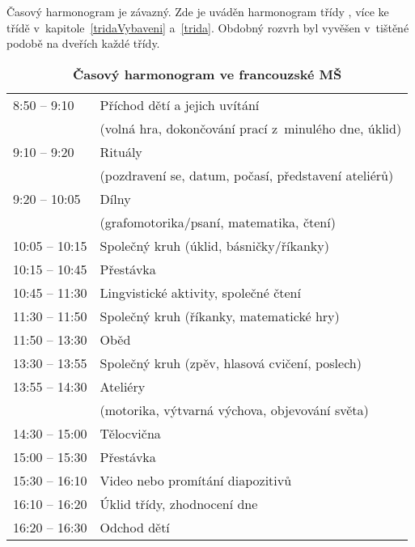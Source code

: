 			Časový harmonogram je závazný. Zde je uváděn harmonogram třídy , více ke třídě v~kapitole~\ref{tridaVybaveni} a~\ref{trida}. Obdobný rozvrh byl vyvěšen v tištěné podobě na dveřích každé třídy. 

\begin{spacing}{1.0}
	\begin{table}[h!]
		\center
		\begin{tabular}{|l l|}
			\hline
			\rowcolor{grey!0}
			8:50 – 9:10 		& Příchod dětí a jejich uvítání 						\\
								& (volná hra, dokončování prací z minulého dne, úklid) 	\\
			9:10 – 9:20			& Rituály 												\\
								& (pozdravení se, datum, počasí, představení ateliérů) 	\\
			9:20 – 10:05		& Dílny 												\\
								& (grafomotorika/psaní, matematika, čtení) 				\\
			10:05 – 10:15		& Společný kruh (úklid, básničky/říkanky) 				\\
			10:15 – 10:45		& Přestávka 											\\
			10:45 – 11:30		& Lingvistické aktivity, společné čtení 				\\
			11:30 – 11:50		& Společný kruh (říkanky, matematické hry) 				\\
			11:50 – 13:30		& Oběd 													\\
			13:30 – 13:55		& Společný kruh (zpěv, hlasová cvičení, poslech) 		\\
			13:55 – 14:30		& Ateliéry 												\\
								&(motorika, výtvarná výchova, objevování světa) 		\\
			14:30 – 15:00		& Tělocvična 											\\
			15:00 – 15:30		& Přestávka 											\\
			15:30 – 16:10		& Video nebo promítání diapozitivů 						\\
			16:10 – 16:20		& Úklid třídy, zhodnocení dne 							\\
			16:20 – 16:30		& Odchod dětí 											\\
			\hline
		\end{tabular}
		\caption{ \textbf{Časový harmonogram ve francouzské MŠ}	
		}
		\label{tab:rezimDneFR}
	\end{table}
	\end{spacing}

